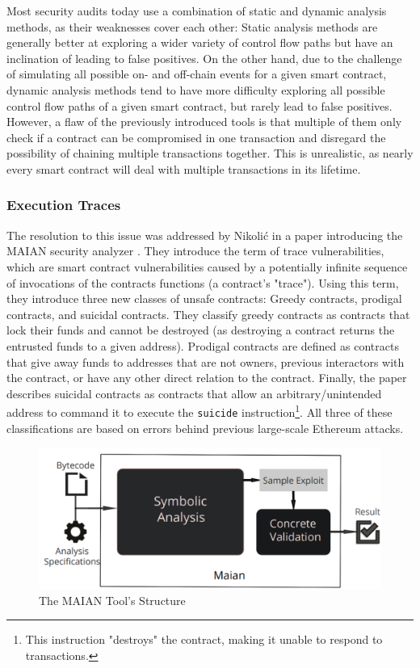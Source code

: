 \documentclass[letterpaper,twocolumn,10pt]{article}
\begin{document}
Most security audits today use a combination of static and dynamic analysis methods, as their weaknesses cover each other: Static analysis methods are generally better at exploring a wider variety of control flow paths but have an inclination of leading to false positives. On the other hand, due to the challenge of simulating all possible on- and off-chain events for a given smart contract, dynamic analysis methods tend to have more difficulty exploring all possible control flow paths of a given smart contract, but rarely lead to false positives. However, a flaw of the previously introduced tools is that multiple of them only check if a contract can be compromised in one transaction and disregard the possibility of chaining multiple transactions together. This is unrealistic, as nearly every smart contract will deal with multiple transactions in its lifetime.

\subsubsection{Execution Traces}
\label{subsection:trace}
The resolution to this issue was addressed by Nikolić in a paper introducing the MAIAN security analyzer \cite{nikolic_kolluri_sergey_saxena_hobor_2018}. They introduce the term of trace vulnerabilities, which are smart contract vulnerabilities caused by a potentially infinite sequence of invocations of the contracts functions (a contract's "trace"). Using this term, they introduce three new classes of unsafe contracts: Greedy contracts, prodigal contracts, and suicidal contracts. They classify greedy contracts as contracts that lock their funds and cannot be destroyed (as destroying a contract returns the entrusted funds to a given address). Prodigal contracts are defined as contracts that give away funds to addresses that are not owners, previous interactors with the contract, or have any other direct relation to the contract. Finally, the paper describes suicidal contracts as contracts that allow an arbitrary/unintended address to command it to execute the \verb|suicide| instruction\footnote{This instruction "destroys" the contract, making it unable to respond to transactions.}. All three of these classifications are based on errors behind previous large-scale Ethereum attacks. 

\begin{figure}
\begin{center}
\includegraphics[scale=0.2]{MAIAN}
\end{center}
\caption{\label{fig:maian} The MAIAN Tool's Structure\cite{nikolic_kolluri_sergey_saxena_hobor_2018}}
\end{figure}
\end{document}
